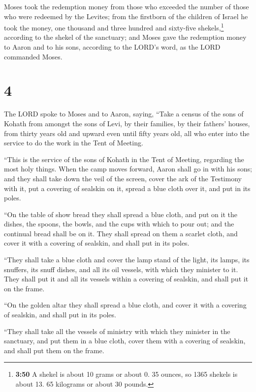  Moses took the redemption money from those who exceeded
the number of those who were redeemed by the Levites; 
from the firstborn of the children of Israel he took the money, one
thousand and three hundred and sixty-five shekels,\footnote{\textbf{3:50}
  A shekel is about 10 grams or about 0. 35 ounces, so 1365 shekels is
  about 13. 65 kilograms or about 30 pounds.} according to the shekel of
the sanctuary;  and Moses gave the redemption money to
Aaron and to his sons, according to the LORD's word, as the LORD
commanded Moses.

\hypertarget{section-3}{%
\section{4}\label{section-3}}

 The LORD spoke to Moses and to Aaron, saying,
 ``Take a census of the sons of Kohath from amongst the
sons of Levi, by their families, by their fathers' houses,
 from thirty years old and upward even until fifty years
old, all who enter into the service to do the work in the Tent of
Meeting.

 ``This is the service of the sons of Kohath in the Tent
of Meeting, regarding the most holy things.  When the camp
moves forward, Aaron shall go in with his sons; and they shall take down
the veil of the screen, cover the ark of the Testimony with it,
 put a covering of sealskin on it, spread a blue cloth
over it, and put in its poles.

 ``On the table of show bread they shall spread a blue
cloth, and put on it the dishes, the spoons, the bowls, and the cups
with which to pour out; and the continual bread shall be on it.
 They shall spread on them a scarlet cloth, and cover it
with a covering of sealskin, and shall put in its poles.

 ``They shall take a blue cloth and cover the lamp stand
of the light, its lamps, its snuffers, its snuff dishes, and all its oil
vessels, with which they minister to it.  They shall put
it and all its vessels within a covering of sealskin, and shall put it
on the frame.

 ``On the golden altar they shall spread a blue cloth,
and cover it with a covering of sealskin, and shall put in its poles.

 ``They shall take all the vessels of ministry with which
they minister in the sanctuary, and put them in a blue cloth, cover them
with a covering of sealskin, and shall put them on the frame.

